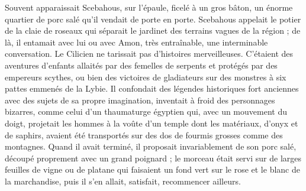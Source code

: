 \documentclass[a4paper, 11pt, oneside, polutonikogreek, french]{article}
\begin{document}
Souvent apparaissait Scebahous, sur l'épaule, ficelé à un gros bâton, un énorme quartier de porc salé qu'il vendait de porte en porte. Scebahous appelait le potier de la claie de roseaux qui séparait le jardinet des terrains vagues de la région ; de là, il entamait avec lui ou avec Amon, très entraînable, une interminable conversation. Le Cilicien ne tarissait pas d'histoires merveilleuses. C'étaient des aventures d'enfants allaités par des femelles de serpents et protégés par des empereurs scythes, ou bien des victoires de gladiateurs sur des monstres à six pattes emmenés de la Lybie. Il confondait des légendes historiques fort anciennes avec des sujets de sa propre imagination, inventait à froid des personnages bizarres, comme celui d'un thaumaturge égyptien qui, avec un mouvement du doigt, projetait les hommes à la voûte d'un temple dont les matériaux, d'onyx et de saphirs, avaient été transportés sur des dos de fourmis grosses comme des montagnes. Quand il avait terminé, il proposait invariablement de son porc salé, découpé proprement avec un grand poignard ; le morceau était servi sur de larges feuilles de vigne ou de platane qui faisaient un fond vert sur le rose et le blanc de la marchandise, puis il s'en allait, satisfait, recommencer ailleurs.
\end{document}
